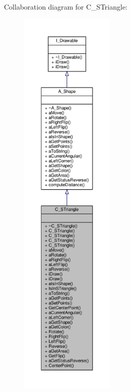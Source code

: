 Collaboration diagram for C\+\_\+\+S\+Triangle\+:\nopagebreak
\begin{figure}[H]
\begin{center}
\leavevmode
\includegraphics[height=550pt]{classC__STriangle__coll__graph}
\end{center}
\end{figure}
